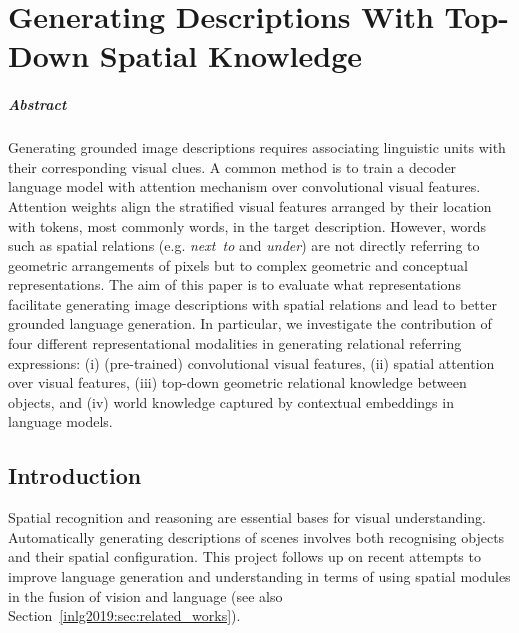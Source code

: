 
\chapter{Generating Descriptions With Top-Down Spatial Knowledge}

\paragraph{Abstract}
Generating grounded image descriptions requires associating linguistic units with their corresponding visual clues.
A common method is to train a decoder language model with attention mechanism over convolutional visual features. %
Attention weights align %
the stratified visual features %
arranged by their location with tokens, most commonly words, in the target description.
However, %
words such as %
spatial relations (e.g. \emph{next~to} and \emph{under}) are not directly referring to geometric arrangements of pixels but to complex geometric and conceptual representations.
The aim of this paper is to evaluate what representations facilitate generating image descriptions with spatial relations and lead to better grounded language generation. %
In particular, we investigate the contribution of four different representational modalities in generating relational referring expressions:
(i) (pre-trained) convolutional visual features, (ii) spatial attention over visual features, (iii) top-down geometric relational knowledge between objects, and (iv) world knowledge captured by contextual embeddings in language models.


\section{Introduction}\label{inlg2019:sec:introduction}

Spatial recognition and reasoning are essential bases for visual understanding.
Automatically generating descriptions of scenes
involves both recognising objects and their spatial configuration.
This project follows up on recent attempts to improve language
generation and understanding %
in terms of using spatial modules in the fusion of vision and
language
\cite{xu2015show,johnson2016densecap,lu2017knowing,hu2017modeling,anderson2018bottom} (see also %
Section~\ref{inlg2019:sec:related_works}).

